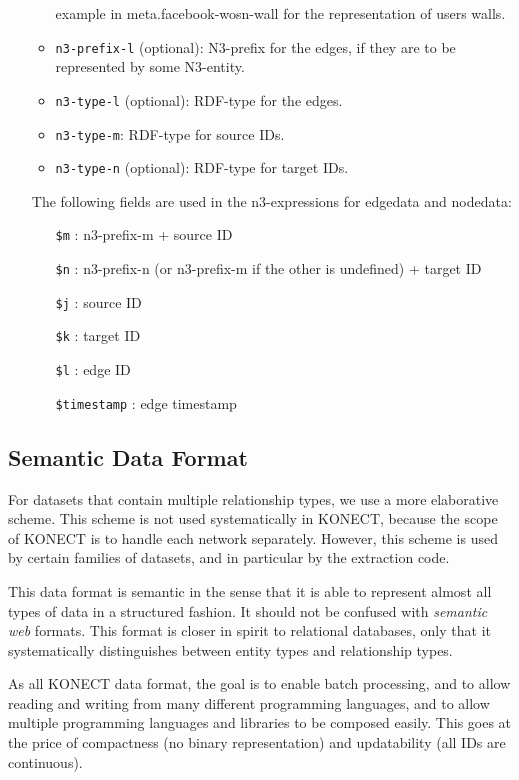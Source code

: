 \documentclass{article}
\begin{document}
\begin{itemize}
\begin{itemize}
    example in meta.facebook-wosn-wall for the
    representation of users walls.
  \item \texttt{n3-prefix-l} (optional): N3-prefix
    for the edges, if they are to be represented
    by some N3-entity.
  \item \texttt{n3-type-l} (optional): RDF-type
    for the edges.
  \item \texttt{n3-type-m}: RDF-type for source
    IDs.
  \item \texttt{n3-type-n} (optional): RDF-type
    for target IDs.
  \end{itemize}
  The following fields are used in the n3-expressions for
  edgedata and nodedata:
  \begin{itemize}
  \item[\texttt{\$m}]: n3-prefix-m + source ID
  \item[\texttt{\$n}]: n3-prefix-n (or n3-prefix-m
    if the other is undefined) + target ID
  \item[\texttt{\$j}]: source ID
  \item[\texttt{\$k}]: target ID
  \item[\texttt{\$l}]: edge ID
  \item[\texttt{\$timestamp}]: edge timestamp
  \end{itemize}
\end{itemize}

\subsection{Semantic Data Format}
For datasets that contain multiple relationship types, we use a more
elaborative scheme.  This scheme is not used systematically in KONECT,
because the scope of KONECT is to handle each network separately.
However, this scheme is used by certain families of datasets, and in
particular by the extraction code. 

This data format is semantic in the sense that it is able to represent
almost all types of data in a structured fashion.  It should not be
confused with \emph{semantic web} formats.  This format is closer in
spirit to relational databases, only that it systematically
distinguishes between entity types and relationship types. 

As all KONECT data format, the goal is to enable batch processing, and
to allow reading and writing from many different programming languages,
and to allow multiple programming languages and libraries to be composed
easily.  This goes at the price of compactness (no binary
representation) and updatability (all IDs are continuous). 
\end{document}
